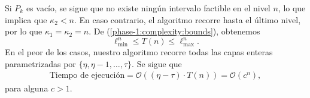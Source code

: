 Si $P_k$ es vacío, se sigue que no existe ningún intervalo factible en el nivel $n$, lo que implica
que $\kappa_2 < n$. En caso contrario, el algoritmo recorre hasta el último nivel, por lo que $\kappa_1
= \kappa_2 = n$. De (\ref{phase-1:complexity:bounds}), obtenemos
\begin{equation}
	\ell_{\min}^{n} \leq T(n) \leq \ell_{\max}^{n}.
\end{equation}
En el peor de los casos, nuestro algoritmo recorre todas las capas enteras parametrizadas por
$\lbrace \eta, \eta - 1, \ldots, \tau\rbrace$. Se sigue que
\begin{align}
	\label{phase-1:time}
	\text{Tiempo de ejecución}
	= \mathcal{O}((\eta - \tau) \cdot T(n))
	= \mathcal{O}(c^{n}),
\end{align}
para alguna $c > 1$.

